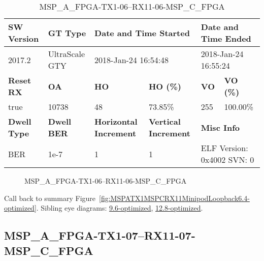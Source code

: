 \begin{table}[h]
\centering
\caption{MSP\_A\_FPGA-TX1-06--RX11-06-MSP\_C\_FPGA}
\label{tab:MSPAFPGATX106RX1106MSPCFPGA6.4-optimized}
\begin{tabular}{@{}|l|l|l|l|l|l|@{}}
\toprule
\textbf{SW Version}                & \textbf{GT Type}   & \multicolumn{2}{l|}{\textbf{Date and Time Started}}            & \multicolumn{2}{l|}{\textbf{Date and Time Ended}}        \\ \midrule
2017.2                       & UltraScale GTY          & \multicolumn{2}{l|}{2018-Jan-24 16:54:48}                   & \multicolumn{2}{l|}{2018-Jan-24 16:55:24}               \\ \midrule
\textbf{Reset RX}                  & \textbf{OA} & \textbf{HO}   & \textbf{HO (\%)} & \textbf{VO} & \textbf{VO (\%)} \\ \midrule
true & 10738        & 48          & 73.85\%        & 255        & 100.00\%       \\ \midrule
\textbf{Dwell Type}                & \textbf{Dwell BER} & \textbf{Horizontal Increment} & \textbf{Vertical Increment}    & \multicolumn{2}{l|}{\textbf{Misc Info}}                  \\ \midrule
BER                            & 1e-7        & 1        & 1           & \multicolumn{2}{l|}{ELF Version: 0x4002 SVN: 0}                         \\ \bottomrule
\end{tabular}
\end{table}

\begin{figure}[h]
\caption{MSP\_A\_FPGA-TX1-06--RX11-06-MSP\_C\_FPGA} \label{fig:MSPAFPGATX106RX1106MSPCFPGA6.4-optimized}
\end{figure}

Call back to summary Figure~\ref{fig:MSPATX1MSPCRX11MinipodLoopback6.4-optimized}.
Sibling eye diagrams: \hyperref[sec:MSPAFPGATX106RX1106MSPCFPGA9.6-optimized]{9.6-optimized}, \hyperref[sec:MSPAFPGATX106RX1106MSPCFPGA12.8-optimized]{12.8-optimized}.

\clearpage
\newpage


\subsection{MSP\_A\_FPGA-TX1-07--RX11-07-MSP\_C\_FPGA}\label{sec:MSPAFPGATX107RX1107MSPCFPGA6.4-optimized}

